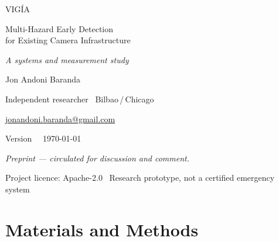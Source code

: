 \documentclass[11pt,a4paper]{article}
\begin{document}
\begin{titlepage}
\centering
\vspace*{4.2cm}

{\Huge\scshape VIGÍA\par}
\vspace{0.9cm}
{\LARGE Multi-Hazard Early Detection\\[2pt] for Existing Camera Infrastructure\par}
\vspace{0.7cm}
{\large\itshape A systems and measurement study\par}

\vspace{2.4cm}
{\large Jon Andoni Baranda\par}
\vspace{0.15cm}
{Independent researcher \textperiodcentered\ Bilbao\,/\,Chicago\par}
{\small \href{mailto:jonandoni.baranda@gmail.com}{jonandoni.baranda@gmail.com}\par}
\vspace{0.35cm}
{Version \DocVersion\ \textperiodcentered\ \today\par}
\vspace{0.25cm}
{\small\itshape Preprint --- circulated for discussion and comment.\par}

\vfill


\vspace{1.2cm}
{\small Project licence: Apache-2.0 \textperiodcentered\ Research prototype,
not a certified emergency system\par}
\end{titlepage}


\cleardoublepage
{\hypersetup{allcolors=black}\tableofcontents}
\cleardoublepage
{}
\setcounter{page}{1}





\section{Materials and Methods}
\label{sec:methods}





\end{document}
